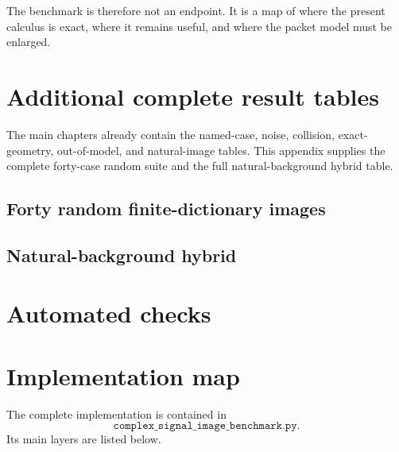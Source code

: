 \documentclass[11pt,oneside,openany]{book}
\theoremstyle{definition}
\theoremstyle{remark}
\begin{document}
The benchmark is therefore not an endpoint. It is a map of where the present calculus is exact, where it remains useful, and where the packet model must be enlarged.

\appendix

\chapter{Additional complete result tables}

The main chapters already contain the named-case, noise, collision, exact-geometry, out-of-model, and natural-image tables. This appendix supplies the complete forty-case random suite and the full natural-background hybrid table.

\section{Forty random finite-dictionary images}


\section{Natural-background hybrid}


\chapter{Automated checks}


\chapter{Implementation map}

The complete implementation is contained in
\[
\texttt{complex\_signal\_image\_benchmark.py}.
\]
Its main layers are listed below.
\end{document}
